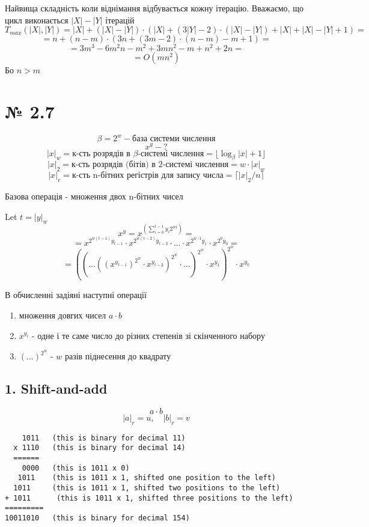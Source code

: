 \documentclass[11pt, a4paper]{article} %
\begin{document}
Найвища складність коли віднімання відбувається кожну ітерацію. 
Вважаємо, що цикл виконається $|X| - |Y|$ ітерацій
$$T_{max}(|X|,|Y|) = |X| + (|X| - |Y|)\cdot (|X| + (3|Y| - 2)\cdot(|X|-|Y|) + |X| + |X| - |Y| + 1) = $$
$$= n + (n-m)\cdot (3n + (3m-2)\cdot (n-m) - m + 1) = $$
$$=3 m^3 - 6 m^2 n - m^2 + 3 m n^2 - m + n^2 + 2 n = $$
$$=O(mn^2)$$
Бо $n > m$

\section*{№ 2.7}

$$\beta = 2^w - \text{база системи числення}$$
$$x^y - ?$$
$$|x|_w = \text{к-сть розрядів в $\beta$-системі числення} = \lfloor\log_\beta |x| + 1\rfloor$$
$$|x|_2 = \text{к-сть розрядів (бітів) в $2$-системі числення} = w\cdot |x|_w$$
$$|x|_r = \text{к-сть n-бітних регістрів для запису числа} = \lceil|x|_2/n\rceil$$

Базова операція - множення двох n-бітних чисел

Let $t = |y|_w$
$$x^y = x^{\left( \sum_{i=0}^{t-1} y_i 2^{wi} \right)} = $$
$$= x^{2^{w(t-1)}y_{t-1}}\cdot x^{2^{w(t-2)}y_{t-2}} \cdot ... \cdot x^{2^{w\cdot 1}y_1} \cdot x^{2^{0}y_0} = $$
$$= (( ... ((x^{y_{t-1}})^{2^{w}} \cdot x^{y_{t-2}})^{2^{w}} \cdot ... )^{2^{w}} \cdot x^{y_1})^{2^{w}} \cdot x^{y_0}$$

В обчисленні задіяні наступні операції
\begin{enumerate}
    \item множення довгих чисел
        \subitem $a \cdot b$ 
    \item $x^{y_i}$ - одне і те саме число до різних степенів зі скінченного набору
    \item $(...)^{2^w}$ - $w$ разів піднесення до квадрату
\end{enumerate}

\subsection*{1. Shift-and-add}
$$a \cdot b$$
$$|a|_r = u,\quad |b|_r = v$$

\begin{lstlisting}
    1011   (this is binary for decimal 11)
  x 1110   (this is binary for decimal 14)
  ======
    0000   (this is 1011 x 0)
   1011    (this is 1011 x 1, shifted one position to the left)
  1011     (this is 1011 x 1, shifted two positions to the left)
+ 1011      (this is 1011 x 1, shifted three positions to the left)
=========
10011010   (this is binary for decimal 154)
\end{lstlisting}
\end{document}
